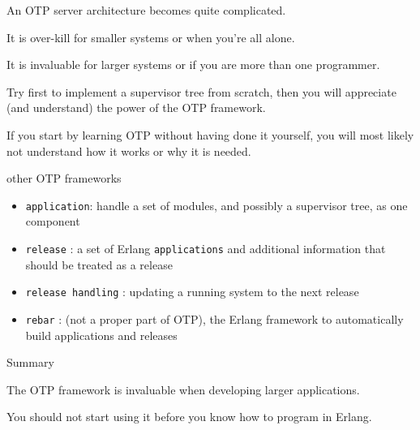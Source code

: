 \begin{frame}

An OTP server architecture becomes quite complicated. 

\pause\vspace{20pt}
It is over-kill for smaller systems or when you're all alone.

\pause\vspace{20pt}
It is invaluable for larger systems or if you are more than one programmer.

\pause\vspace{20pt}
Try first to implement a supervisor tree from scratch, then you will
appreciate (and understand) the power of the OTP framework.

\pause\vspace{20pt}
If you start by learning OTP without having done it yourself, you will
most likely not understand how it works or why it is needed.


\end{frame}

\begin{frame}{other OTP frameworks}

\begin{itemize}
\item {\tt application}: handle a set of modules, and possibly a supervisor tree,  as one component
\pause
\item {\tt release} : a set of Erlang {\tt applications} and additional information that should be treated as a release
\pause
\item {\tt release handling} : updating a running system to the next release
\pause
\item {\tt rebar} : (not a proper part of OTP), the Erlang framework to automatically build applications and releases 
\end{itemize}
\end{frame}

\begin{frame}{Summary}

The OTP framework is invaluable when developing larger applications. 

\pause\vspace{20pt}

You should not start using it before you know how to program in Erlang.



\end{frame}






